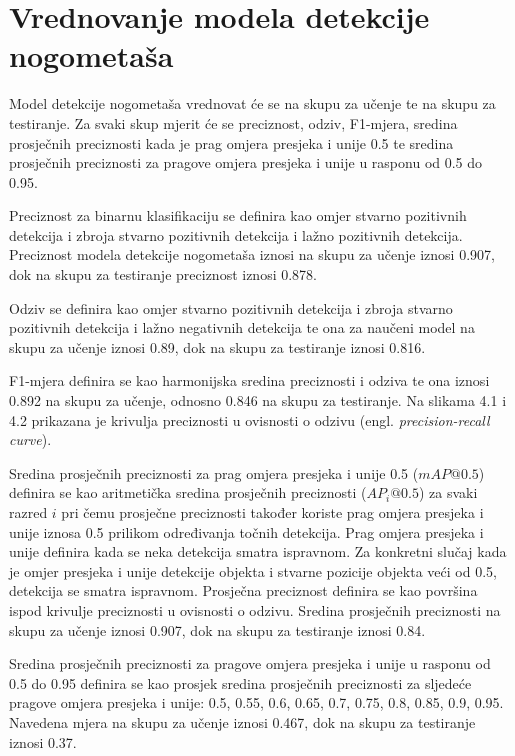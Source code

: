 \documentclass[times, utf8, seminar, numeric]{fer}
\begin{document}
\section{Vrednovanje modela detekcije nogometaša}

Model detekcije nogometaša vrednovat će se na skupu za učenje te na skupu za testiranje. Za svaki skup mjerit će se preciznost, odziv, F1-mjera, sredina prosječnih preciznosti kada je prag omjera presjeka i unije 0.5 te sredina prosječnih preciznosti za pragove omjera presjeka i unije u rasponu od 0.5 do 0.95.

Preciznost za binarnu klasifikaciju se definira kao omjer stvarno pozitivnih detekcija i zbroja stvarno pozitivnih detekcija i lažno pozitivnih detekcija. Preciznost modela detekcije nogometaša iznosi na skupu za učenje iznosi 0.907, dok na skupu za testiranje preciznost iznosi  0.878.

Odziv se definira kao omjer stvarno pozitivnih detekcija i zbroja stvarno pozitivnih detekcija i lažno negativnih detekcija te ona za naučeni model na skupu za učenje iznosi 0.89, dok na skupu za testiranje iznosi 0.816.

F1-mjera definira se kao harmonijska sredina preciznosti i odziva te ona iznosi 0.892 na skupu za učenje, odnosno 0.846 na skupu za testiranje.
Na slikama 4.1 i 4.2  prikazana je krivulja preciznosti u ovisnosti o odzivu (engl. \textit{precision-recall curve}).


Sredina prosječnih preciznosti za prag omjera presjeka i unije 0.5 (\(mAP@0.5\)) definira se kao aritmetička sredina prosječnih preciznosti (\(AP_i@0.5\)) za svaki razred \(i\) pri čemu prosječne preciznosti također koriste prag omjera presjeka i unije iznosa 0.5 prilikom određivanja točnih detekcija.
Prag omjera presjeka i unije definira kada se neka detekcija smatra ispravnom. Za konkretni slučaj kada je omjer presjeka i unije detekcije objekta i stvarne pozicije objekta veći od 0.5, detekcija se smatra ispravnom.	
Prosječna preciznost definira se kao površina ispod krivulje preciznosti u ovisnosti o odzivu.
Sredina prosječnih preciznosti na skupu za učenje iznosi 0.907, dok na skupu za testiranje iznosi 0.84. 

Sredina prosječnih preciznosti za pragove omjera presjeka i unije u rasponu od 0.5 do 0.95 definira se kao prosjek sredina prosječnih preciznosti za sljedeće pragove omjera presjeka i unije: 0.5, 0.55, 0.6, 0.65, 0.7, 0.75, 0.8, 0.85, 0.9, 0.95.
Navedena mjera na skupu za učenje iznosi 0.467, dok na skupu za testiranje iznosi 0.37.
\end{document}
